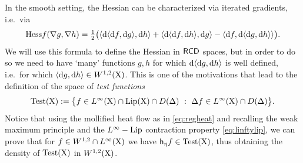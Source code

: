 \documentclass[11pt]{article}
\numberwithin{equation}{section}
\newcommand{\X}{{\rm X}}
\newcommand{\RCD}{{\sf RCD}}
\renewcommand{\d}{{\rm d}}
\newcommand{\Lip}{{\rm Lip}}
\newcommand{\h}{{\sf h}} %
\newcommand\la{\langle}
\newcommand\ra{\rangle}
\newcommand{\test}{{\rm Test}}
\begin{document}
In the smooth setting, the Hessian can be characterized via iterated gradients, i.e.\ via
\begin{equation}
\label{eq:Hesssmoooth}
{\rm Hess}f(\nabla g,\nabla h)=\tfrac12\big(\la\d\la\d f,\d g\ra,\d h\ra+\la\d \la\d f,\d h\ra,\d g\ra-\la\d f,\d\la\d g,\d h\ra\ra\big).
\end{equation}
We will use this formula to define the Hessian in $\RCD$ spaces, but in order to do so we need to have `many' functions $g,h$ for which $\d\la\d g,\d h\ra$ is well defined, i.e.\ for which $\la\d g,\d h\ra\in W^{1,2}(\X)$. This is one of the motivations that lead to the definition of the  space of \emph{test functions}
\[
\test(\X):=\big\{f\in L^\infty(\X)\cap\Lip(\X)\cap D(\Delta)\ :\ \Delta f\in L^\infty(\X)\cap D(\Delta)\big\}.
\]
Notice that using the mollified heat flow as in \eqref{eq:regheat} and recalling  the weak maximum principle and the $L^\infty-\Lip$ contraction property \eqref{eq:linftylip}, we can prove that   for $f\in W^{1,2}\cap L^\infty(\X)$ we have $\h_\eta f\in \test(\X)$, thus obtaining the density of $\test(\X)$ in $W^{1,2}(\X)$.
\end{document}
